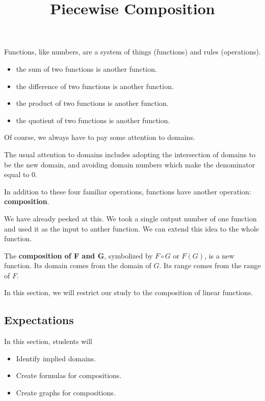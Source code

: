 \documentclass{ximera}
\title{Piecewise Composition}
\begin{document}
\begin{abstract}
\end{abstract}
\maketitle




Functions, like numbers, are a system of things (functions) and rules (operations).  

\begin{itemize}
\item the sum of two functions is another function.
\item the difference of two functions is another function.
\item the product of two functions is another function.
\item the quotient of two functions is another function.
\end{itemize}

Of course, we always have to pay some attention to domains.



The usual attention to domains includes adopting the intersection of domains to be the new domain, and avoiding domain numbers which make the denominator equal to $0$.



In addition to these four familiar operations, functions have another operation: \textbf{composition}.

We have already peeked at this. We took a single output number of one function and used it as the input to anther function.  We can extend this idea to the whole function.


The \textbf{composition of F and G}, symbolized by $F \circ G$ or $F(G)$, is a new function.  Its domain comes from the domain of $G$. Its range comes from the range of $F$.



In this section, we will restrict our study to the composition of linear functions.














\subsection{Expectations}



\begin{sectionOutcomes}
In this section, students will 

\begin{itemize}
\item Identify implied domains.
\item Create formulas for compositions.
\item Create graphs for compositions.
\end{itemize}
\end{sectionOutcomes}
\end{document}
